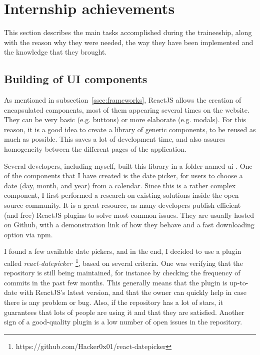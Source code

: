 \section{Internship achievements}
\label{sec:accomplish}

This section describes the main tasks accomplished during the traineeship, along with the reason why they were needed, the way they have been implemented and the knowledge that they brought.

\subsection{Building of UI components}
\label{ssec:ui_components}

As mentioned in {\sc subsection}~\ref{ssec:frameworks}, ReactJS allows the creation of encapsulated components, most of them appearing several times on the website. They can be very basic (e.g. buttons) or more elaborate (e.g. modals). For this reason, it is a good idea to create a library of generic components, to be reused as much as possible. This saves a lot of development time, and also assures homogeneity between the different pages of the application.

Several developers, including myself, built this library in a folder named \guillemotleft{} ui \guillemotright{}. One of the components that I have created is the date picker, for users to choose a date (day, month, and year) from a calendar. Since this is a rather complex component, I first performed a research on existing solutions inside the open source community. It is a great resource, as many developers publish efficient (and free) ReactJS plugins to solve most common issues. They are usually hosted on Github, with a demonstration link of how they behave and a fast downloading option via npm.

I found a few available date pickers, and in the end, I decided to use a plugin called \textit{react-datepicker}~\footnote{https://github.com/Hacker0x01/react-datepicker}, based on several criteria. One was verifying that the repository is still being maintained, for instance by checking the frequency of commits in the past few months. This generally means that the plugin is up-to-date with ReactJS's latest version, and that the owner can quickly help in case there is any problem or bug. Also, if the repository has a lot of stars, it guarantees that lots of people are using it and that they are satisfied. Another sign of a good-quality plugin is a low number of open issues in the repository.

